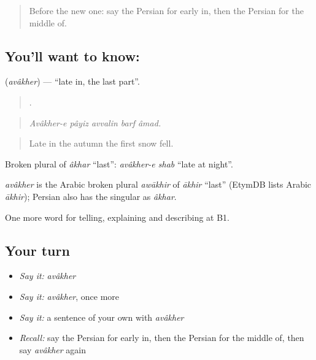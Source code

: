 \label{lesson:FA-C307-avakher}



\begin{quote}
Before the new one: say the Persian for early in, then the Persian for the middle of.
\end{quote}

\subsection*{You'll want to know: }
\textbf{} (\emph{avâkher}) — \textquotedblleft{}late in, the last part\textquotedblright{}.

\begin{quote}
    .
\end{quote}

\begin{quote}
\emph{Avâkher-e pâyiz avvalin barf âmad.}
\end{quote}

\begin{quote}
Late in the autumn the first snow fell.
\end{quote}

Broken plural of \emph{âkhar} \textquotedblleft{}last\textquotedblright{}: \emph{avâkher-e shab} \textquotedblleft{}late at night\textquotedblright{}.

\begin{cousinweb}
\emph{avâkher} is the Arabic broken plural \emph{awākhir} of \emph{ākhir} \textquotedblleft{}last\textquotedblright{} (EtymDB lists Arabic \emph{ākhir}); Persian also has the singular as \emph{âkhar}.
\end{cousinweb}

\begin{grammarlens}[title={What you've built}]
One more word for telling, explaining and describing at B1.
\end{grammarlens}

\subsection*{Your turn}
\begin{itemize}
\raggedright
  \item \emph{Say it:} \emph{avâkher}
  \item \emph{Say it:} \emph{avâkher}, once more
  \item \emph{Say it:} a sentence of your own with \emph{avâkher}
  \item \emph{Recall:} say the Persian for early in, then the Persian for the middle of, then say \emph{avâkher} again
\end{itemize}

